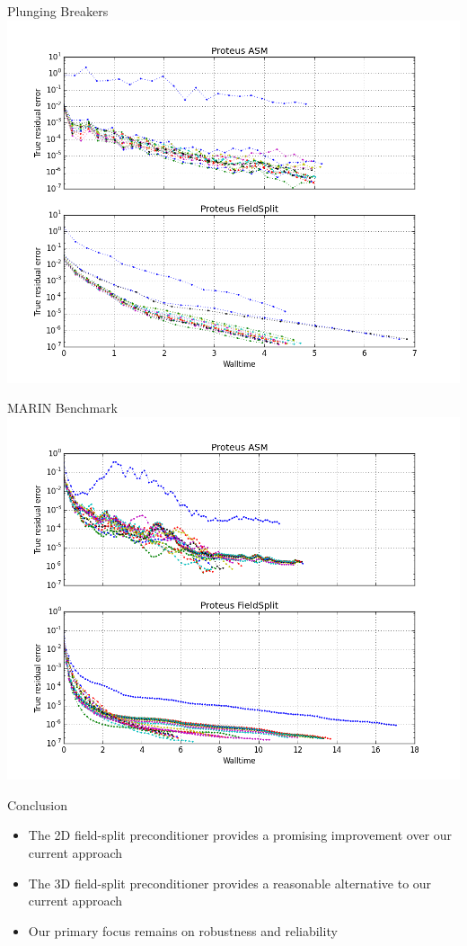 \documentclass{beamer}
\begin{document}
\begin{frame}{Plunging Breakers}
    \includegraphics[width=\textwidth]{figures/plunging_comparison.png}
\end{frame}

\begin{frame}{MARIN Benchmark}
    \includegraphics[width=\textwidth]{figures/marin_comparison.png}
\end{frame}

\begin{frame}{Conclusion}
  \begin{itemize}
  \item The 2D field-split preconditioner provides a promising improvement over
    our current approach
  \item The 3D field-split preconditioner provides a reasonable
    alternative to our current approach
  \item Our primary focus remains on robustness and reliability
  \end{itemize}
\end{frame}
\end{document}
